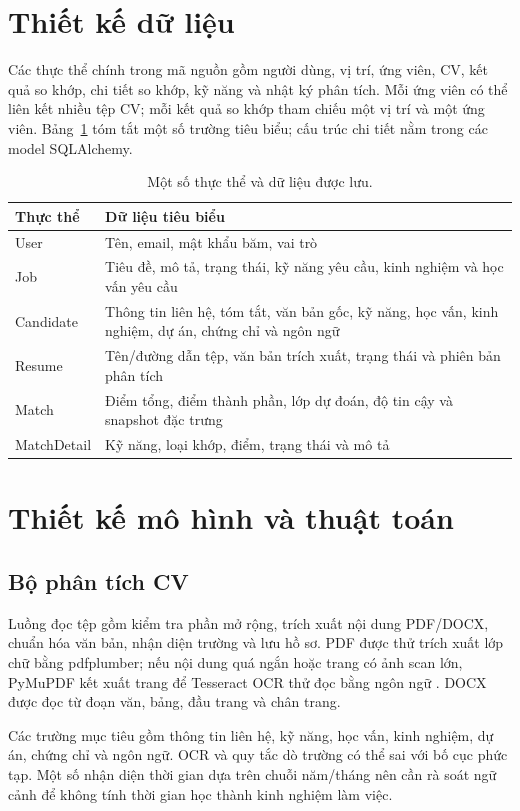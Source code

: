 \section{Thiết kế dữ liệu}
Các thực thể chính trong mã nguồn gồm người dùng, vị trí, ứng viên, CV, kết quả so khớp, chi tiết so khớp, kỹ năng và nhật ký phân tích. Mỗi ứng viên có thể liên kết nhiều tệp CV; mỗi kết quả so khớp tham chiếu một vị trí và một ứng viên. Bảng~\ref{tab:thucthe} tóm tắt một số trường tiêu biểu; cấu trúc chi tiết nằm trong các model SQLAlchemy.

\begin{table}[H]
\centering
\caption{Một số thực thể và dữ liệu được lưu.}
\label{tab:thucthe}
\begin{tabular}{p{}p{}}
\toprule
\textbf{Thực thể} & \textbf{Dữ liệu tiêu biểu} \\
\midrule
User & Tên, email, mật khẩu băm, vai trò \\
Job & Tiêu đề, mô tả, trạng thái, kỹ năng yêu cầu, kinh nghiệm và học vấn yêu cầu \\
Candidate & Thông tin liên hệ, tóm tắt, văn bản gốc, kỹ năng, học vấn, kinh nghiệm, dự án, chứng chỉ và ngôn ngữ \\
Resume & Tên/đường dẫn tệp, văn bản trích xuất, trạng thái và phiên bản phân tích \\
Match & Điểm tổng, điểm thành phần, lớp dự đoán, độ tin cậy và snapshot đặc trưng \\
MatchDetail & Kỹ năng, loại khớp, điểm, trạng thái và mô tả \\
\bottomrule
\end{tabular}
\end{table}

\section{Thiết kế mô hình và thuật toán}
\subsection{Bộ phân tích CV}
Luồng đọc tệp gồm kiểm tra phần mở rộng, trích xuất nội dung PDF/DOCX, chuẩn hóa văn bản, nhận diện trường và lưu hồ sơ. PDF được thử trích xuất lớp chữ bằng pdfplumber; nếu nội dung quá ngắn hoặc trang có ảnh scan lớn, PyMuPDF kết xuất trang để Tesseract OCR thử đọc bằng ngôn ngữ . DOCX được đọc từ đoạn văn, bảng, đầu trang và chân trang.

Các trường mục tiêu gồm thông tin liên hệ, kỹ năng, học vấn, kinh nghiệm, dự án, chứng chỉ và ngôn ngữ. OCR và quy tắc dò trường có thể sai với bố cục phức tạp. Một số nhận diện thời gian dựa trên chuỗi năm/tháng nên cần rà soát ngữ cảnh để không tính thời gian học thành kinh nghiệm làm việc.

